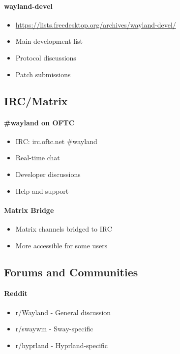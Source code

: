 \paragraph{wayland-devel}
\begin{itemize}
    \item \url{https://lists.freedesktop.org/archives/wayland-devel/}
    \item Main development list
    \item Protocol discussions
    \item Patch submissions
\end{itemize}

\subsection{IRC/Matrix}

\paragraph{\#wayland on OFTC}
\begin{itemize}
    \item IRC: irc.oftc.net \#wayland
    \item Real-time chat
    \item Developer discussions
    \item Help and support
\end{itemize}

\paragraph{Matrix Bridge}
\begin{itemize}
    \item Matrix channels bridged to IRC
    \item More accessible for some users
\end{itemize}

\subsection{Forums and Communities}

\paragraph{Reddit}
\begin{itemize}
    \item r/Wayland - General discussion
    \item r/swaywm - Sway-specific
    \item r/hyprland - Hyprland-specific
\end{itemize}

